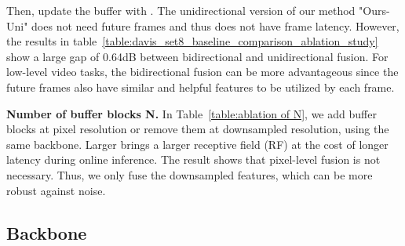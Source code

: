 \documentclass[sigconf]{acmart}
\begin{document}
Then, update the buffer  with .
The unidirectional version of our method "Ours-Uni" does not need future frames and thus does not have frame latency. However, the results in table~\ref{table:davis_set8_baseline_comparison_ablation_study} show a large gap of 0.64dB between bidirectional and unidirectional fusion.
For low-level video tasks, the bidirectional fusion can be more advantageous since the future frames also have similar and helpful features to be utilized by each frame.






\textbf{Number of buffer blocks N.}
In Table~\ref{table:ablation of N}, we add buffer blocks at pixel resolution or remove them at downsampled resolution, using the same backbone.
Larger  brings a larger receptive field (RF) at the cost of longer latency during online inference. 
The result shows that pixel-level fusion is not necessary. Thus, we only fuse the downsampled features, which can be more robust against noise.


\begin{table}[t]
\small
\centering
\caption{Ablation study for the number of buffer blocks . \vspace{-5pt}
}
\renewcommand{\arraystretch}{0.9}
\label{table:ablation of N}
\end{table}

\subsection{Backbone}
\end{document}
